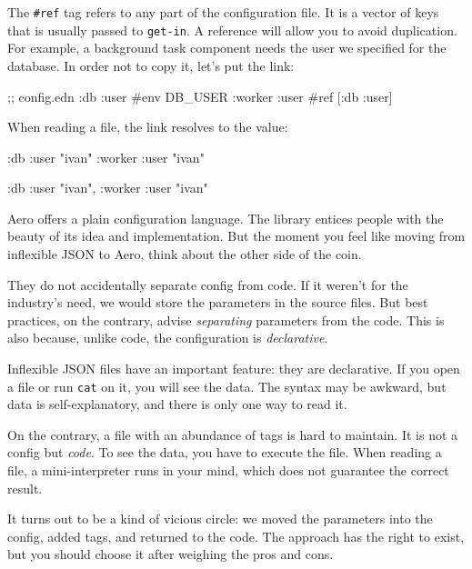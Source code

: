 The \verb|#ref| tag refers to any part of the configuration file. It is a vector of keys that is usually passed to \verb|get-in|. A reference will allow you to avoid duplication. For example, a background task component needs the user we specified for the database. In order not to copy it, let's put the link:

\begin{clojure}
;; config.edn
{:db {:user #env DB_USER}
 :worker {:user #ref [:db :user]}}
\end{clojure}

\noindent
When reading a file, the link resolves to the value:

\ifnarrow

\begin{clojure}
{:db {:user "ivan"}
 :worker {:user "ivan"}}
\end{clojure}

\else

\begin{clojure}
{:db {:user "ivan"}, :worker {:user "ivan"}}
\end{clojure}

\fi

Aero offers a plain configuration language. The library entices people with the beauty of its idea and implementation. But the moment you feel like moving from inflexible JSON to Aero, think about the other side of the coin.


They do not accidentally separate config from code. If it weren't for the industry's need, we would store the parameters in the source files. But best practices, on the contrary, advise \emph{separating} parameters from the code. This is also because, unlike code, the configuration is \emph{declarative}.

Inflexible JSON files have an important feature: they are declarative. If you open a file or run \verb|cat| on it, you will see the data. The syntax may be awkward, but data is self-explanatory, and there is only one way to read it.

On the contrary, a file with an abundance of tags is hard to maintain. It is not a config but \emph{code}. To see the data, you have to execute the file. When reading a file, a mini-interpreter runs in your mind, which does not guarantee the correct result.

It turns out to be a kind of vicious circle: we moved the parameters into the config, added tags, and returned to the code. The approach has the right to exist, but you should choose it after weighing the pros and cons.

